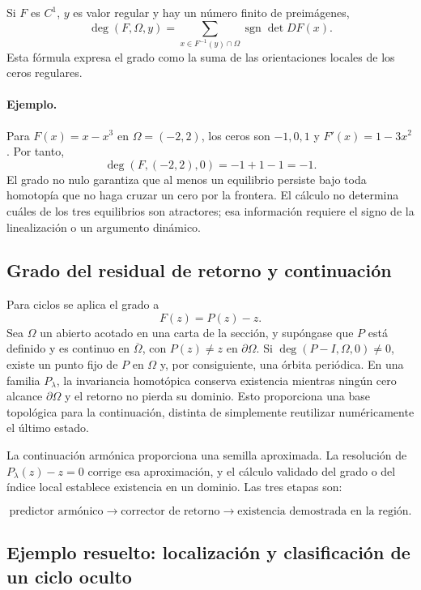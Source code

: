 Si $F$ es $C^1$, $y$ es valor regular y hay un número finito de preimágenes,
\begin{equation}
 \deg(F,\Omega,y)=
 \sum_{x\in F^{-1}(y)\cap\Omega}
 \operatorname{sgn}\det DF(x).
 \label{eq:guide-degree-regular}
\end{equation}
Esta fórmula expresa el grado como la suma de las orientaciones locales de
los ceros regulares.

\paragraph{Ejemplo.}
Para $F(x)=x-x^3$ en $\Omega=(-2,2)$, los ceros son $-1,0,1$ y
$F'(x)=1-3x^2$. Por tanto,
\[
 \deg(F,(-2,2),0)=-1+1-1=-1.
\]
El grado no nulo garantiza que al menos un equilibrio persiste bajo toda
homotopía que no haga cruzar un cero por la frontera. El cálculo no determina
cuáles de los tres equilibrios son atractores; esa información requiere el
signo de la linealización o un argumento dinámico.

\subsection{Grado del residual de retorno y continuación}

Para ciclos se aplica el grado a
\begin{equation}
 F(z)=P(z)-z.
 \label{eq:guide-degree-return}
\end{equation}
Sea \(\Omega\) un abierto acotado en una carta de la sección, y supóngase
que \(P\) está definido y es continuo en \(\overline\Omega\), con
\(P(z)\ne z\) en \(\partial\Omega\). Si
$\deg(P-I,\Omega,0)\neq0$, existe un punto fijo de $P$ en $\Omega$ y, por
consiguiente, una órbita periódica.
En una familia $P_\lambda$, la invariancia homotópica conserva existencia
mientras ningún cero alcance $\partial\Omega$ y el retorno no pierda su
dominio. Esto proporciona una base topológica para la continuación, distinta
de simplemente reutilizar numéricamente el último estado.

La continuación armónica proporciona una semilla aproximada. La resolución
de $P_\lambda(z)-z=0$ corrige esa aproximación, y el cálculo validado del
grado o del índice local establece existencia en un dominio. Las tres etapas
son:

\[
 \text{predictor armónico}
 \longrightarrow
 \text{corrector de retorno}
 \longrightarrow
 \text{existencia demostrada en la región}.
\]

\subsection{Ejemplo resuelto: localización y clasificación de un ciclo oculto}
\label{subsec:guide-hidden-cycle-topology}

